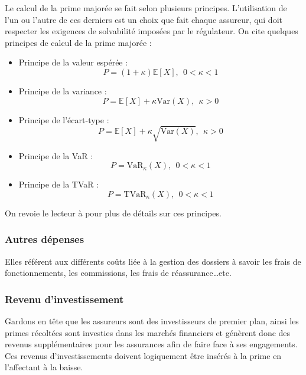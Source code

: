 \documentclass[11pt]{article}
\begin{document}
Le calcul de la prime majorée se fait selon plusieurs principes. L'utilisation de l'un ou l'autre de ces derniers est un choix que fait chaque assureur, qui doit respecter les exigences de solvabilité imposées par le régulateur. On cite quelques principes de calcul de la prime majorée :
\begin{itemize}
\item Principe de la valeur espérée : 
\begin{equation*}
P = (1+\kappa)\mathbb{E}[X], ~~ 0 < \kappa < 1
\end{equation*}
\item Principe de la variance : 
\begin{equation*}
P = \mathbb{E}[X] + \kappa\text{Var}(X), ~~ \kappa > 0
\end{equation*}
\item Principe de l'écart-type : 
\begin{equation*}
P = \mathbb{E}[X] + \kappa\sqrt{\text{Var}(X)}, ~~ \kappa > 0
\end{equation*}
\item Principe de la VaR : 
\begin{equation*}
P = \text{VaR}_\kappa(X), ~~ 0 < \kappa < 1
\end{equation*}
\item Principe de la TVaR : 
\begin{equation*}
P = \text{TVaR}_\kappa(X), ~~ 0 < \kappa < 1
\end{equation*}
\end{itemize} 

On revoie le lecteur à \cite{marceau2013modelisation} pour plus de détails sur ces principes.

\subsubsection{Autres dépenses}
Elles référent aux différents coûts liée à la gestion des dossiers à savoir les frais de fonctionnements, les commissions, les frais de réassurance…etc.

\subsubsection{Revenu d’investissement} 
Gardons en tête que les assureurs sont des investisseurs de premier plan, ainsi les primes récoltées sont investies dans les marchés financiers et génèrent donc des revenus supplémentaires pour les assurances afin de faire face à ses engagements. Ces revenus d’investissements doivent logiquement être insérés à la prime en l’affectant à la baisse.\\
\end{document}
